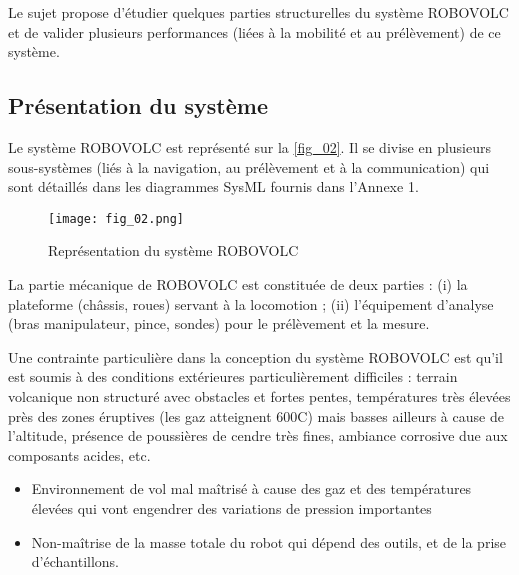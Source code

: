 \begin{obj}
Le sujet propose d'étudier quelques parties structurelles du système ROBOVOLC et de
valider plusieurs performances (liées à la mobilité et au prélèvement) de ce système. 
\end{obj}

\subsection{Présentation du système}


Le système ROBOVOLC est représenté sur la \autoref{fig_02}. Il se divise en plusieurs sous-systèmes
(liés à la navigation, au prélèvement et à la communication) qui sont détaillés dans les
diagrammes SysML fournis dans l'Annexe 1. 

\begin{figure}[H]
\centering
\texttt{[image: fig\_02.png]}
\caption{Représentation du système ROBOVOLC \label{fig_02}}
\end{figure}

La partie mécanique de ROBOVOLC est constituée de deux parties : (i) la plateforme (châssis,
roues) servant à la locomotion ; (ii) l'équipement d'analyse (bras manipulateur, pince, sondes) pour
le prélèvement et la mesure.

Une contrainte particulière dans la conception du système ROBOVOLC est qu'il est soumis à des
conditions extérieures particulièrement difficiles : terrain volcanique non structuré avec obstacles et
fortes pentes, températures très élevées près des zones éruptives (les gaz atteignent 600\degres C) mais
basses ailleurs à cause de l'altitude, présence de poussières de cendre très fines, ambiance
corrosive due aux composants acides, etc.


\ifprof
\begin{corrige}
\begin{itemize}
\item Environnement de vol mal maîtrisé à cause des gaz et des températures élevées qui vont engendrer des variations de pression importantes
\item Non-maîtrise de la masse totale du robot qui dépend des outils, et de la prise d’échantillons. 
\end{itemize}
\end{corrige}
\else
\fi

